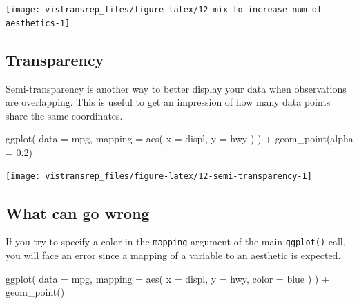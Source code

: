 \documentclass[]{book}
\newenvironment{Shaded}{}{}
\newcommand{\DataTypeTok}[1]{#1}
\newcommand{\FloatTok}[1]{#1}
\newcommand{\KeywordTok}[1]{\textcolor[rgb]{0.00,0.00,1.00}{#1}}
\newcommand{\NormalTok}[1]{#1}
\newcommand{\OperatorTok}[1]{#1}
\newcommand{\StringTok}[1]{\textcolor[rgb]{0.00,0.50,0.50}{#1}}
\begin{document}
\begin{flushright}\texttt{[image: vistransrep\_files/figure-latex/12-mix-to-increase-num-of-aesthetics-1]} \end{flushright}

\hypertarget{transparency}{%
\subsection{Transparency}\label{transparency}}

Semi-transparency is another way to better display your data when observations are overlapping.
This is useful to get an impression of how many data points share the same coordinates.

\begin{Shaded}
\begin{Highlighting}[]
\KeywordTok{ggplot}\NormalTok{(}
  \DataTypeTok{data =}\NormalTok{ mpg,}
  \DataTypeTok{mapping =} \KeywordTok{aes}\NormalTok{(}
    \DataTypeTok{x =}\NormalTok{ displ,}
    \DataTypeTok{y =}\NormalTok{ hwy}
\NormalTok{  )}
\NormalTok{) }\OperatorTok{+}
\StringTok{  }\KeywordTok{geom_point}\NormalTok{(}\DataTypeTok{alpha =} \FloatTok{0.2}\NormalTok{)}
\end{Highlighting}
\end{Shaded}

\begin{flushright}\texttt{[image: vistransrep\_files/figure-latex/12-semi-transparency-1]} \end{flushright}

\hypertarget{what-can-go-wrong}{%
\subsection{What can go wrong}\label{what-can-go-wrong}}

If you try to specify a color in the \texttt{mapping}-argument of the main \texttt{ggplot()} call, you will face an error since a mapping of a variable to an aesthetic is expected.

\begin{Shaded}
\begin{Highlighting}[]
\KeywordTok{ggplot}\NormalTok{(}
  \DataTypeTok{data =}\NormalTok{ mpg,}
  \DataTypeTok{mapping =} \KeywordTok{aes}\NormalTok{(}
    \DataTypeTok{x =}\NormalTok{ displ,}
    \DataTypeTok{y =}\NormalTok{ hwy,}
    \DataTypeTok{color =}\NormalTok{ blue}
\NormalTok{  )}
\NormalTok{) }\OperatorTok{+}
\StringTok{  }\KeywordTok{geom_point}\NormalTok{()}
\end{Highlighting}
\end{Shaded}
\end{document}
